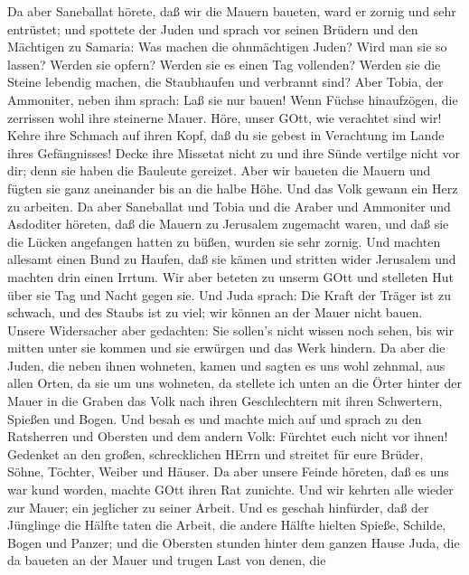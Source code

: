  Da aber Saneballat hörete, daß wir die Mauern baueten, ward
er zornig und sehr entrüstet; und spottete der Juden  und
sprach vor seinen Brüdern und den Mächtigen zu Samaria: Was machen die
ohnmächtigen Juden? Wird man sie so lassen? Werden sie opfern? Werden
sie es einen Tag vollenden? Werden sie die Steine lebendig machen, die
Staubhaufen und verbrannt sind?  Aber Tobia, der Ammoniter,
neben ihm sprach: Laß sie nur bauen! Wenn Füchse hinaufzögen, die
zerrissen wohl ihre steinerne Mauer.  Höre, unser GOtt, wie
verachtet sind wir! Kehre ihre Schmach auf ihren Kopf, daß du sie gebest
in Verachtung im Lande ihres Gefängnisses!  Decke ihre
Missetat nicht zu und ihre Sünde vertilge nicht vor dir; denn sie haben
die Bauleute gereizet.  Aber wir baueten die Mauern und
fügten sie ganz aneinander bis an die halbe Höhe. Und das Volk gewann
ein Herz zu arbeiten.  Da aber Saneballat und Tobia und die
Araber und Ammoniter und Asdoditer höreten, daß die Mauern zu Jerusalem
zugemacht waren, und daß sie die Lücken angefangen hatten zu büßen,
wurden sie sehr zornig.  Und machten allesamt einen Bund zu
Haufen, daß sie kämen und stritten wider Jerusalem und machten drin
einen Irrtum.  Wir aber beteten zu unserm GOtt und stelleten
Hut über sie Tag und Nacht gegen sie.  Und Juda sprach: Die
Kraft der Träger ist zu schwach, und des Staubs ist zu viel; wir können
an der Mauer nicht bauen.  Unsere Widersacher aber
gedachten: Sie sollen's nicht wissen noch sehen, bis wir mitten unter
sie kommen und sie erwürgen und das Werk hindern.  Da aber
die Juden, die neben ihnen wohneten, kamen und sagten es uns wohl
zehnmal, aus allen Orten, da sie um uns wohneten,  da
stellete ich unten an die Örter hinter der Mauer in die Graben das Volk
nach ihren Geschlechtern mit ihren Schwertern, Spießen und Bogen.
 Und besah es und machte mich auf und sprach zu den
Ratsherren und Obersten und dem andern Volk: Fürchtet euch nicht vor
ihnen! Gedenket an den großen, schrecklichen HErrn und streitet für eure
Brüder, Söhne, Töchter, Weiber und Häuser.  Da aber unsere
Feinde höreten, daß es uns war kund worden, machte GOtt ihren Rat
zunichte. Und wir kehrten alle wieder zur Mauer; ein jeglicher zu seiner
Arbeit.  Und es geschah hinfürder, daß der Jünglinge die
Hälfte taten die Arbeit, die andere Hälfte hielten Spieße, Schilde,
Bogen und Panzer; und die Obersten stunden hinter dem ganzen Hause Juda,
 die da baueten an der Mauer und trugen Last von denen, die
